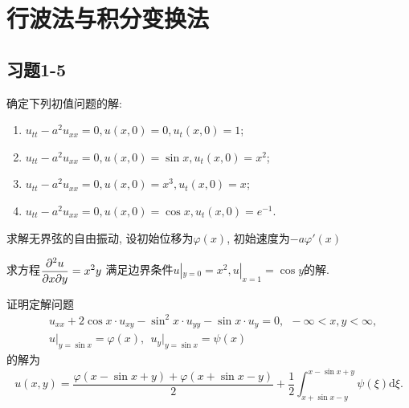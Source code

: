 \chapter{行波法与积分变换法}

\section{习题1-5}

\begin{yyEx}
	确定下列初值问题的解:
	\begin{enumerate}
		\item $u_{tt}-a^2u_{xx} = 0, u(x,0) = 0, u_t(x,0) = 1$;
		\item $u_{tt}-a^2u_{xx} = 0, u(x,0) = \sin x, u_t(x,0) = x^2$;
		\item $u_{tt}-a^2u_{xx} = 0, u(x,0) = x^3, u_t(x,0) = x$;
		\item $u_{tt}-a^2u_{xx} = 0, u(x,0) =\cos x, u_t(x,0) = e^{-1}$.
	\end{enumerate}
\end{yyEx}

\begin{yyEx}
	求解无界弦的自由振动, 设初始位移为$\varphi(x)$, 初始速度为$-a\varphi'(x)$
\end{yyEx}

\begin{yyEx}
	求方程$\begin{lgathered}
		\frac{\partial^2 u}{\partial x\partial y} = x^2y
	\end{lgathered}$ 满足边界条件$u|_{y = 0} = x^2, u|_{x = 1} = \cos y$的解.
\end{yyEx}

\begin{yyEx}
	证明定解问题
	\begin{equation*}
		\begin{split}
			&u_{xx}+2\cos x\cdot u_{xy} - \sin^2x\cdot u_{yy} - \sin x\cdot u_y = 0,~~-\infty<x,y<\infty,\\
			&u\big|_{y = \sin x} = \varphi(x),~~u_y\big|_{y = \sin x} = \psi(x)
		\end{split}
	\end{equation*}
	的解为
	\begin{equation*}
		u(x,y) = \frac{\varphi(x-\sin x+y) + \varphi(x+\sin x-y)}{2} + \frac{1}{2}\int_{x+\sin x-y}^{x-\sin x+y}\psi(\xi)\mathrm{d}\xi.
	\end{equation*}
\end{yyEx}

